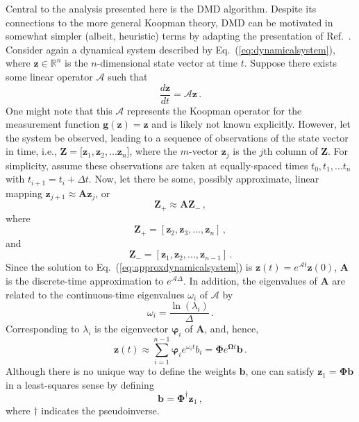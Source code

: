 \documentclass[review,number,sort&compress,12pt]{elsarticle}
\begin{document}
Central to the analysis presented here is the DMD algorithm.
Despite its connections to the more general Koopman theory, DMD can be motivated in somewhat simpler (albeit, heuristic) terms by adapting the presentation of Ref.~\cite{kutzbook}.
Consider again a dynamical system described by Eq.~(\ref{eq:dynamicalsystem}), where $\mathbf{z} \in \mathbb{R}^n$ is the $n$-dimensional state vector at time $t$.
Suppose there exists some linear operator $\mathcal{A}$ such that
\begin{equation}
 \frac{d \mathbf{z}}{dt} = \mathcal{A} \mathbf{z} \, .
 \label{eq:approxdynamicalsystem}
\end{equation}
One might note that this $\mathcal{A}$ represents the Koopman operator for the measurement function $\mathbf{g}(\mathbf{z}) = \mathbf{z}$ and is likely not known explicitly.
However, let the system be observed, leading to a sequence of observations of the state vector in time, i.e., $\mathbf{Z} = [\mathbf{z}_{1}, \mathbf{z}_{2}, \ldots \mathbf{z}_{n}$], where the $m$-vector $\mathbf{z}_{j}$ is the $j$th column of $\mathbf{Z}$. 
For simplicity, assume these observations are taken at equally-spaced times $t_0, t_1, \ldots t_n$ with $t_{i+1} = t_i + \Delta t$.  
Now, let there be some, possibly approximate, linear mapping $\mathbf{z}_{j+1} \approx \mathbf{A}\mathbf{z}_{j}$, or \begin{equation}
   \mathbf{Z}_+ \approx \mathbf{A}\mathbf{Z}_- \, ,
   \label{eq:linearmapping}
\end{equation}
where
\begin{equation}
  \mathbf{Z}_+ =  [\mathbf{z}_{2},\mathbf{z}_{3}, \ldots,\mathbf{z}_{n}] \, ,
\end{equation}
and
\begin{equation}
 \mathbf{Z}_- =  [ \mathbf{z}_{1},\mathbf{z}_{2},\ldots, \mathbf{z}_{n-1}] \,  .                                                                                                           
\end{equation}
Since the solution to Eq.~(\ref{eq:approxdynamicalsystem}) is $\mathbf{z}(t) = e^{\mathcal{A}t}\mathbf{z}(0)$, $\mathbf{A}$ is the discrete-time approximation to $e^{\mathcal{A}\Delta}$.
In addition, the  eigenvalues of $\mathbf{A}$ are related to the continuous-time eigenvalues $\omega_i$ of $\mathcal{A}$ by 
\begin{equation}
 \omega_i = \frac{\ln{(\lambda_i)}}{\Delta} \, .
\end{equation}
Corresponding to $\lambda_i$ is the eigenvector $\boldsymbol{\varphi}_i$ of $\mathbf{A}$, and, hence,
\begin{equation}
 \mathbf{z}(t) \approx \sum^{n-1}_{i=1} \boldsymbol{\varphi}_i e^{\omega_i t} b_i = \boldsymbol{\Phi}e^{\boldsymbol{\Omega}t}\mathbf{b} \, . 
 \label{eq:dmdreconstruction}
\end{equation}
Although there is no unique way to define the weights $\mathbf{b}$, one can satisfy $\mathbf{z}_1 = \boldsymbol{\Phi}\mathbf{b}$  in a least-squares sense by defining
\begin{equation}
 \mathbf{b} = \boldsymbol{\Phi}^{\dagger} \mathbf{z}_1 \, ,
 \label{eq:amplitudes}
\end{equation}
where $\dagger$ indicates the pseudoinverse. 
\end{document}
